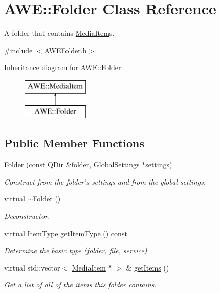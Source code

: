 \hypertarget{class_a_w_e_1_1_folder}{\section{A\-W\-E\-:\-:Folder Class Reference}
\label{class_a_w_e_1_1_folder}
}


A folder that contains {\ttfamily \hyperlink{class_a_w_e_1_1_media_item}{Media\-Item}}s.  




{\ttfamily \#include $<$A\-W\-E\-Folder.\-h$>$}

Inheritance diagram for A\-W\-E\-:\-:Folder\-:\begin{figure}[H]
\begin{center}
\leavevmode
\includegraphics[height=2.000000cm]{class_a_w_e_1_1_folder}
\end{center}
\end{figure}
\subsection*{Public Member Functions}
\begin{DoxyCompactItemize}
\item 
\hyperlink{class_a_w_e_1_1_folder_aca86ae7182f2288bce2b97086fe44561}{Folder} (const Q\-Dir \&folder, \hyperlink{class_a_w_e_1_1_global_settings}{Global\-Settings} $\ast$settings)
\begin{DoxyCompactList}\small\item\em Construct from the folder's settings and from the global settings. \end{DoxyCompactList}\item 
\hypertarget{class_a_w_e_1_1_folder_a7b9eaf0f340d5275809494685b0a3e1d}{virtual \hyperlink{class_a_w_e_1_1_folder_a7b9eaf0f340d5275809494685b0a3e1d}{$\sim$\-Folder} ()}\label{class_a_w_e_1_1_folder_a7b9eaf0f340d5275809494685b0a3e1d}

\begin{DoxyCompactList}\small\item\em Deconstructor. \end{DoxyCompactList}\item 
virtual Item\-Type \hyperlink{class_a_w_e_1_1_folder_a315c0a52f6e37b357d5f0e4fc5526d52}{get\-Item\-Type} () const 
\begin{DoxyCompactList}\small\item\em Determine the basic type (folder, file, service) \end{DoxyCompactList}\item 
virtual std\-::vector$<$ \hyperlink{class_a_w_e_1_1_media_item}{Media\-Item} $\ast$ $>$ \& \hyperlink{class_a_w_e_1_1_folder_a7a11c8d61ad23a24e300a6ba9c37cf7a}{get\-Items} ()
\begin{DoxyCompactList}\small\item\em Get a list of all of the items this folder contains. \end{DoxyCompactList}\end{DoxyCompactItemize}

